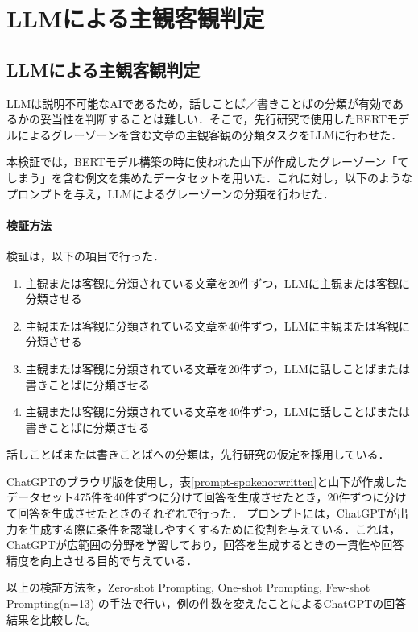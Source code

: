\chapter{LLMによる主観客観判定 \label{c5}}

\section{LLMによる主観客観判定 \label{c5s2}}
LLMは説明不可能なAIであるため，話しことば／書きことばの分類が有効であるかの妥当性を判断することは難しい．そこで，先行研究で使用したBERTモデルによるグレーゾーンを含む文章の主観客観の分類タスクをLLMに行わせた．

本検証では，BERTモデル構築の時に使われた山下が作成したグレーゾーン「てしまう」を含む例文を集めたデータセットを用いた．これに対し，以下のようなプロンプトを与え，LLMによるグレーゾーンの分類を行わせた．



\subsubsection{検証方法}
検証は，以下の項目で行った．
\begin{enumerate}
    \item 主観または客観に分類されている文章を20件ずつ，LLMに主観または客観に分類させる
    \item 主観または客観に分類されている文章を40件ずつ，LLMに主観または客観に分類させる
    \item 主観または客観に分類されている文章を20件ずつ，LLMに話しことばまたは書きことばに分類させる
    \item 主観または客観に分類されている文章を40件ずつ，LLMに話しことばまたは書きことばに分類させる
\end{enumerate}
話しことばまたは書きことばへの分類は，先行研究\cite{checker}の仮定を採用している．

ChatGPTのブラウザ版を使用し，表\ref{prompt-spokenorwritten}と山下が作成したデータセット475件を40件ずつに分けて回答を生成させたとき，20件ずつに分けて回答を生成させたときのそれぞれで行った．
プロンプトには，ChatGPTが出力を生成する際に条件を認識しやすくするために役割を与えている．これは，ChatGPTが広範囲の分野を学習しており，回答を生成するときの一貫性や回答精度を向上させる目的で与えている．




以上の検証方法を，Zero-shot Prompting, One-shot Prompting, Few-shot Prompting(n=13) の手法で行い，例の件数を変えたことによるChatGPTの回答結果を比較した。

